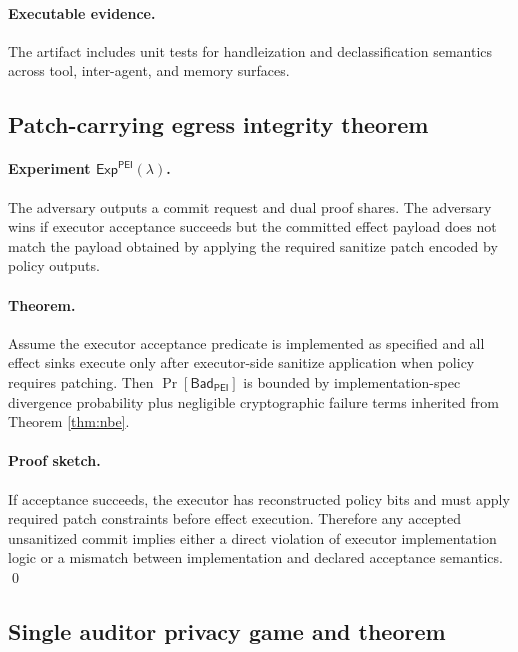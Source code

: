 \paragraph{Executable evidence.}
The artifact includes unit tests for handleization and declassification semantics across tool,
inter-agent, and memory surfaces.

\subsection{Patch-carrying egress integrity theorem}
\label{app:proofs:pei}

\paragraph{Experiment $\mathsf{Exp}^{\mathsf{PEI}}(\lambda)$.}
The adversary outputs a commit request and dual proof shares.
The adversary wins if executor acceptance succeeds but the committed effect payload does not match the
payload obtained by applying the required sanitize patch encoded by policy outputs.

\paragraph{Theorem.}
\begin{theorem}\label{thm:pei}
Assume the executor acceptance predicate is implemented as specified and all effect sinks execute only
after executor-side sanitize application when policy requires patching.
Then $\Pr[\mathsf{Bad}_{\mathsf{PEI}}]$ is bounded by implementation-spec divergence probability plus
negligible cryptographic failure terms inherited from Theorem \ref{thm:nbe}.
\end{theorem}

\paragraph{Proof sketch.}
If acceptance succeeds, the executor has reconstructed policy bits and must apply required patch
constraints before effect execution.
Therefore any accepted unsanitized commit implies either a direct violation of executor implementation
logic or a mismatch between implementation and declared acceptance semantics.
\qed

\subsection{Single auditor privacy game and theorem}
\label{app:proofs:sap}

